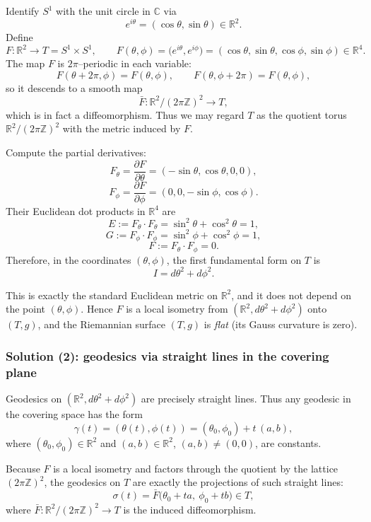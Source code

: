 \documentclass[12pt,a4paper]{article}
\theoremstyle{plain}
\theoremstyle{definition}      %
\begin{document}
Identify $S^{1}$ with the unit circle in $\mathbb{C}$ via
\[
e^{i\theta} = (\cos\theta,\sin\theta)\in\mathbb{R}^{2}.
\]
Define
\[
F : \mathbb{R}^{2} \longrightarrow T = S^{1}\times S^{1},\qquad
F(\theta,\phi) = \bigl(e^{i\theta},e^{i\phi}\bigr)
= (\cos\theta,\sin\theta,\cos\phi,\sin\phi)
\in \mathbb{R}^{4}.
\]
The map $F$ is $2\pi$--periodic in each variable:
\[
F(\theta+2\pi,\phi) = F(\theta,\phi),
\qquad
F(\theta,\phi+2\pi) = F(\theta,\phi),
\]
so it descends to a smooth map
\[
\bar F : \mathbb{R}^{2} / (2\pi\mathbb{Z})^{2} \longrightarrow T,
\]
which is in fact a diffeomorphism.  Thus we may regard $T$ as the quotient
torus $\mathbb{R}^{2}/(2\pi\mathbb{Z})^{2}$ with the metric induced by $F$.

Compute the partial derivatives:
\[
F_{\theta}
= \frac{\partial F}{\partial\theta}
= (-\sin\theta,\cos\theta,0,0),
\]
\[
F_{\phi}
= \frac{\partial F}{\partial\phi}
= (0,0,-\sin\phi,\cos\phi).
\]
Their Euclidean dot products in $\mathbb{R}^{4}$ are
\[
E := F_{\theta}\cdot F_{\theta}
= \sin^{2}\theta + \cos^{2}\theta = 1,
\]
\[
G := F_{\phi}\cdot F_{\phi}
= \sin^{2}\phi + \cos^{2}\phi = 1,
\]
\[
F := F_{\theta}\cdot F_{\phi}
= 0.
\]
Therefore, in the coordinates $(\theta,\phi)$, the first fundamental form
on $T$ is
\[
I = d\theta^{2} + d\phi^{2}.
\]

This is exactly the standard Euclidean metric on $\mathbb{R}^{2}$, and it
does not depend on the point $(\theta,\phi)$.  Hence $F$ is a local
isometry from $(\mathbb{R}^{2},d\theta^{2}+d\phi^{2})$ onto $(T,g)$, and the
Riemannian surface $(T,g)$ is \emph{flat} (its Gauss curvature is zero).

\subsubsection*{Solution (2): geodesics via straight lines in the covering plane}

Geodesics on $(\mathbb{R}^{2},d\theta^{2}+d\phi^{2})$ are precisely straight
lines.  Thus any geodesic in the covering space has the form
\[
\gamma(t) = (\theta(t),\phi(t))
= (\theta_{0},\phi_{0}) + t\,(a,b),
\]
where $(\theta_{0},\phi_{0})\in\mathbb{R}^{2}$ and $(a,b)\in\mathbb{R}^{2}$,
$(a,b)\neq (0,0)$, are constants.

Because $F$ is a local isometry and factors through the quotient by the
lattice $(2\pi\mathbb{Z})^{2}$, the geodesics on $T$ are exactly the
projections of such straight lines:
\[
\sigma(t)
= \bar F\bigl(\theta_{0}+ta,\ \phi_{0}+tb\bigr)
\in T,
\]
where $\bar F:\mathbb{R}^{2}/(2\pi\mathbb{Z})^{2}\to T$ is the induced
diffeomorphism.
\end{document}
